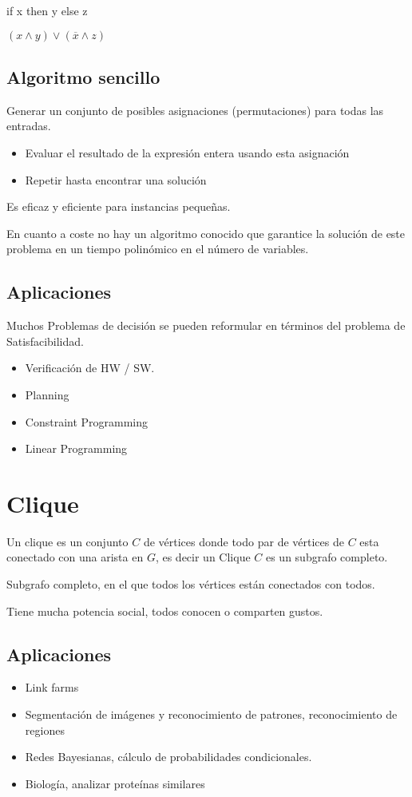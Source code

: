 if x then y else z

$(x \wedge y) \vee (\overline{x} \wedge z)$

\subsection{Algoritmo sencillo}
Generar un conjunto de posibles asignaciones (permutaciones) para todas las entradas.
\begin{itemize}
    \item Evaluar el resultado de la expresión entera usando esta asignación
    \item Repetir hasta encontrar una solución
\end{itemize}
Es eficaz y eficiente para instancias pequeñas.

En cuanto a coste no hay un algoritmo conocido que garantice la solución de este problema en un tiempo polinómico en el número de variables.

\subsection{Aplicaciones}
Muchos Problemas de decisión se pueden reformular en términos del problema de Satisfacibilidad.
\begin{itemize}
    \item Verificación de HW / SW.
    \item Planning
    \item Constraint Programming
    \item Linear Programming
\end{itemize}

\section{Clique}
Un clique es un conjunto $C$ de vértices donde todo par de vértices de $C$ esta conectado con una arista en $G$, es decir un Clique $C$ es un subgrafo completo.

Subgrafo completo, en el que todos los vértices están conectados con todos.

Tiene mucha potencia social, todos conocen o comparten gustos.

\subsection{Aplicaciones}
\begin{itemize}
    \item Link farms
    \item Segmentación de imágenes y reconocimiento de patrones, reconocimiento de regiones
    \item Redes Bayesianas, cálculo de probabilidades condicionales.
    \item Biología, analizar proteínas similares
\end{itemize}

